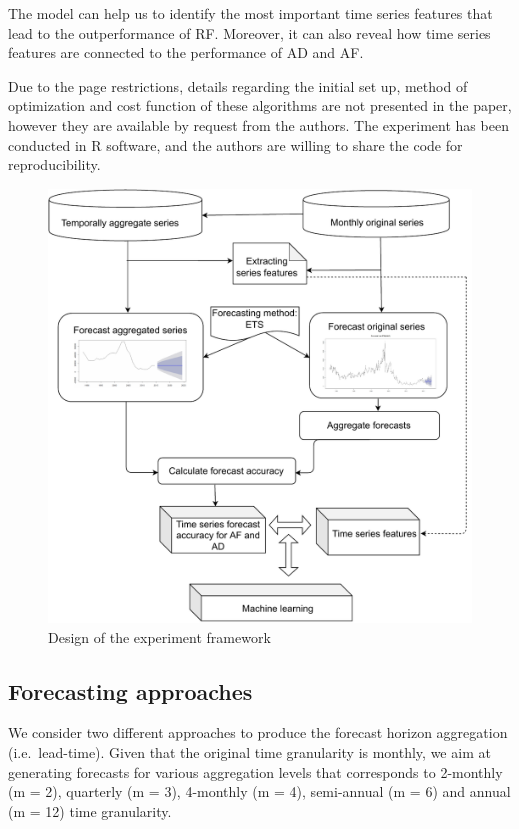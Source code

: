 \documentclass[preprint, 3p,
authoryear]{elsarticle} %
\begin{document}
The model can help us to identify the most important time series
features that lead to the outperformance of RF. Moreover, it can also
reveal how time series features are connected to the performance of AD
and AF.

Due to the page restrictions, details regarding the initial set up,
method of optimization and cost function of these algorithms are not
presented in the paper, however they are available by request from the
authors. The experiment has been conducted in R software, and the
authors are willing to share the code for reproducibility.

\begin{figure}[H]

{\centering \includegraphics[width=0.7\linewidth]{img/300dpi/experiment_design} 

}

\caption{Design of the experiment framework}\label{fig:expdes}
\end{figure}

\hypertarget{forecasting-approaches}{%
\subsection{Forecasting approaches}\label{forecasting-approaches}}

We consider two different approaches to produce the forecast horizon
aggregation (i.e.~lead-time). Given that the original time granularity
is monthly, we aim at generating forecasts for various aggregation
levels that corresponds to 2-monthly (m = 2), quarterly (m = 3),
4-monthly (m = 4), semi-annual (m = 6) and annual (m = 12) time
granularity.
\end{document}
